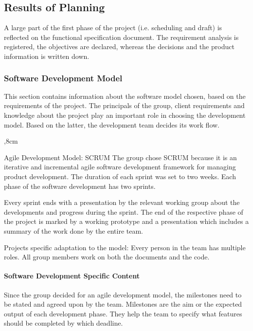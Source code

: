 \subsection{Results of Planning}
A large part of the first phase of the project (i.e. scheduling and draft) is reflected on %
the functional specification document. The requirement analysis is registered, the objectives are declared, whereas the decisions and the product information is written down.

\subsubsection{Software Development Model}

This section contains information about the software model chosen, based on the requirements of the project.
The principals of the group, client requirements and knowledge about the project play an important role in choosing the development model. Based on the latter, the development team decides its work flow. 

\begin{aims}
	,8cm
	\item[Agile Development Model: SCRUM] The group chose SCRUM because it is an iterative and incremental agile software development framework for managing product development. The duration of each sprint was set to two weeks. Each phase of the software development has two sprints. 
	
	Every sprint ends with a presentation by the relevant %
	 working group about the developments and progress during the sprint. The end of the respective phase of the project is marked by a working prototype and a presentation which includes a summary of the work done by the entire team. 
	
	\item[Projects specific adaptation to the model:] Every person in the team has multiple roles. All group members work on both the documents and the code.
\end{aims} 

\paragraph{Software Development Specific Content}
Since the group decided for an agile development model, the milestones need to be stated and agreed upon by the team. Milestones are the aim or the expected output of each development phase. They help the team to specify what features should be completed by which deadline.

